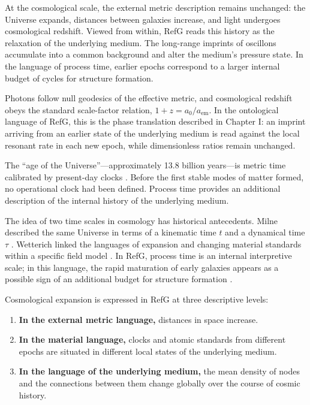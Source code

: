 \documentclass[11pt,a4paper]{article}
\begin{document}
At the cosmological scale, the external metric description remains unchanged: the Universe expands, distances between galaxies increase, and light undergoes cosmological redshift. Viewed from within, RefG reads this history as the relaxation of the underlying medium. The long-range imprints of oscillons accumulate into a common background and alter the medium's pressure state. In the language of process time, earlier epochs correspond to a larger internal budget of cycles for structure formation.

Photons follow null geodesics of the effective metric, and cosmological redshift obeys the standard scale-factor relation, $1+z=a_0/a_{\mathrm{em}}$. In the ontological language of RefG, this is the phase translation described in Chapter I: an imprint arriving from an earlier state of the underlying medium is read against the local resonant rate in each new epoch, while dimensionless ratios remain unchanged.

The ``age of the Universe''---approximately 13.8 billion years---is metric time calibrated by present-day clocks \citep{planck2020}. Before the first stable modes of matter formed, no operational clock had been defined. Process time provides an additional description of the internal history of the underlying medium.

The idea of two time scales in cosmology has historical antecedents. Milne described the same Universe in terms of a kinematic time $t$ and a dynamical time $\tau$ \citep{milne1935,milne1948}. Wetterich linked the languages of expansion and changing material standards within a specific field model \citep{wetterich2013}. In RefG, process time is an internal interpretive scale; in this language, the rapid maturation of early galaxies appears as a possible sign of an additional budget for structure formation \citep{labbe2023}.

Cosmological expansion is expressed in RefG at three descriptive levels:

\begin{enumerate}
\item \textbf{In the external metric language,} distances in space increase.
\item \textbf{In the material language,} clocks and atomic standards from different epochs are situated in different local states of the underlying medium.
\item \textbf{In the language of the underlying medium,} the mean density of nodes and the connections between them change globally over the course of cosmic history.
\end{enumerate}
\end{document}
